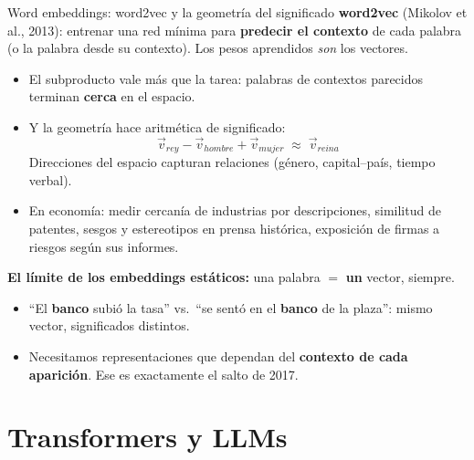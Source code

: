 \documentclass{beamer}
\newcommand{\1}{\mathbb{I}}
\begin{document}
\begin{frame}{Word embeddings: word2vec y la geometría del significado}
\small
\textbf{word2vec} (Mikolov et al., 2013): entrenar una red mínima para \textbf{predecir el contexto} de cada palabra (o la palabra desde su contexto). Los pesos aprendidos \emph{son} los vectores.
\pause

\begin{itemize}\itemsep5pt
  \item El subproducto vale más que la tarea: palabras de contextos parecidos terminan \textbf{cerca} en el espacio.
  \item Y la geometría hace aritmética de significado:
  \[ \vec{v}_{rey} - \vec{v}_{hombre} + \vec{v}_{mujer} \;\approx\; \vec{v}_{reina} \]
  Direcciones del espacio capturan relaciones (género, capital--país, tiempo verbal). \pause
  \item En economía: medir cercanía de industrias por descripciones, similitud de patentes, sesgos y estereotipos en prensa histórica, exposición de firmas a riesgos según sus informes. \pause
\end{itemize}

\vspace{0.1cm}
\textbf{El límite de los embeddings estáticos:} una palabra $=$ \textbf{un} vector, siempre.
\begin{itemize}\itemsep3pt
  \item ``El \textbf{banco} subió la tasa'' vs.\ ``se sentó en el \textbf{banco} de la plaza'': mismo vector, significados distintos.
  \item Necesitamos representaciones que dependan del \textbf{contexto de cada aparición}. Ese es exactamente el salto de 2017.
\end{itemize}
\end{frame}


\section{Transformers y LLMs}
\begin{frame}[noframenumbering]
\tableofcontents[currentsection]
\end{frame}
\end{document}
